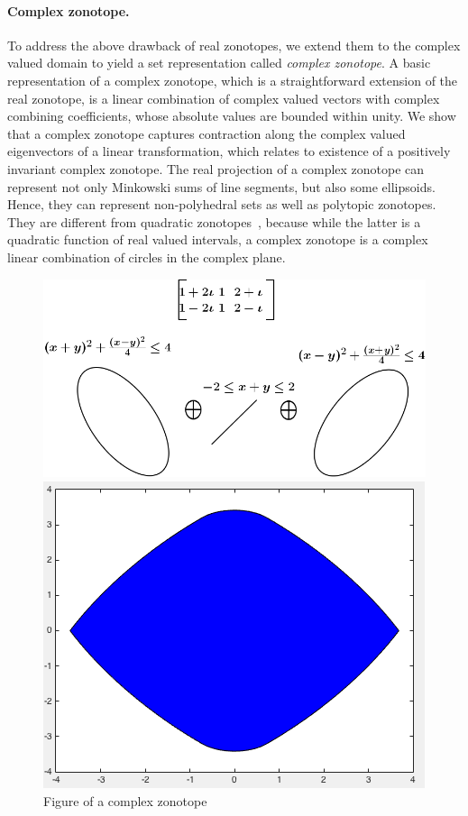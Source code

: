 \documentclass[11pt,a4paper,twoside,openright]{article}
\begin{document}
\paragraph{Complex zonotope.}  To address the above drawback of real
zonotopes, we extend them to the complex valued domain to yield a set
representation called {\it complex zonotope}.  A basic representation
of a complex zonotope, which is a straightforward extension of the real
zonotope, is a linear combination of complex valued vectors with
complex combining coefficients, whose absolute values are bounded
within unity.  We show that a complex zonotope captures contraction
along the complex valued eigenvectors of a linear transformation,
which relates to existence of a positively invariant complex zonotope.
The real projection of a complex zonotope can represent not only
Minkowski sums of line segments, but also some ellipsoids.  Hence,
they can represent non-polyhedral sets as well as polytopic zonotopes.
They are different from quadratic
zonotopes~\cite{DBLP:conf/aplas/AdjeGW15}, because while the latter
is a quadratic function of real valued intervals, a complex zonotope
is a complex linear combination of circles in the complex plane.
%
\begin{figure}
  \begin{minipage}{0.5\textwidth}
    \includegraphics[scale=0.6]{figures/complex-zonotope.png}
  \end{minipage}
  \hspace{5em}
  \begin{minipage}{0.4\textwidth}
    \includegraphics[scale=0.3]{figures/CZhull.png}
  \end{minipage}
  \caption{Figure of a complex zonotope}
\end{figure}
%
\end{document}
